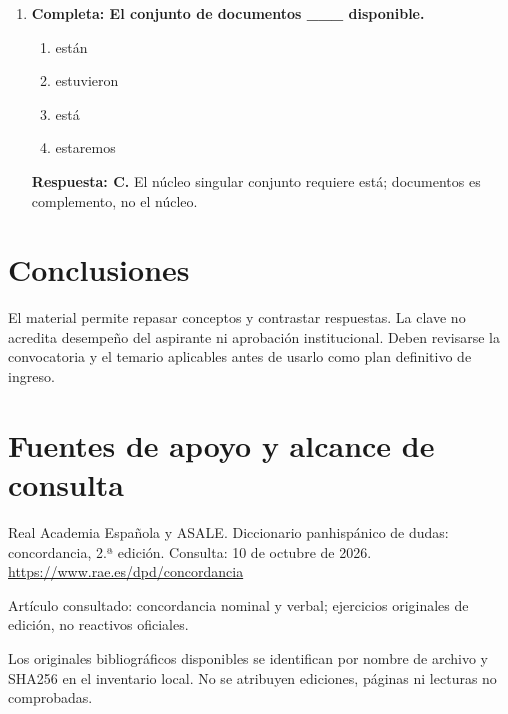 \begin{enumerate}
\begin{enumerate}[label=\Alph*)]
\item Ordenar propósito, método, resultados y límites
\item Eliminar todas las fuentes
\item Sustituir resultados por opiniones
\end{enumerate}
\textbf{Respuesta: B.} Ordenar estructura preserva evidencia; las otras alteran o degradan su respaldo.
\item\textbf{Completa: El conjunto de documentos \_\_\_ disponible.}
\begin{enumerate}[label=\Alph*)]
\item están
\item estuvieron
\item está
\item estaremos
\end{enumerate}
\textbf{Respuesta: C.} El núcleo singular conjunto requiere está; documentos es complemento, no el núcleo.
\end{enumerate}

\section{Conclusiones}
El material permite repasar conceptos y contrastar respuestas. La clave no acredita desempeño del aspirante ni aprobación institucional. Deben revisarse la convocatoria y el temario aplicables antes de usarlo como plan definitivo de ingreso.
\clearpage\section{Fuentes de apoyo y alcance de consulta}
Real Academia Española y ASALE. Diccionario panhispánico de dudas: concordancia, 2.ª edición. Consulta: 10 de octubre de 2026. \url{https://www.rae.es/dpd/concordancia}\par Artículo consultado: concordancia nominal y verbal; ejercicios originales de edición, no reactivos oficiales.\par\medskip
Los originales bibliográficos disponibles se identifican por nombre de archivo y SHA256 en el inventario local. No se atribuyen ediciones, páginas ni lecturas no comprobadas.


